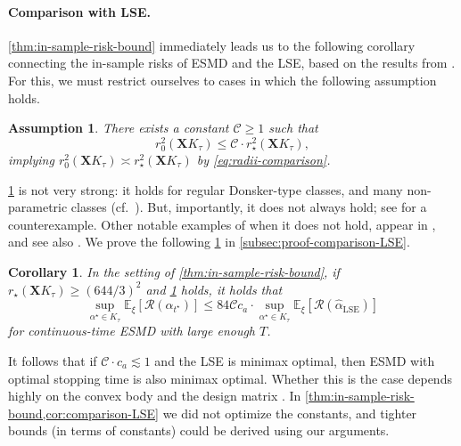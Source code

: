 \documentclass[a4paper]{article}
\newcommand{\br}[1]{\left[#1\right]}
\newcommand{\X}[0]{\mathbf{X}}
\newcommand{\EE}[0]{\mathbb{E}}
\newcommand{\cC}[0]{\mathcal{C}}
\newcommand{\cR}[0]{\mathcal{R}}
\newcommand{\ha}[0]{\widehat{\alpha}}
\newcommand{\alphastar}{\alpha^\star}
\newcommand{\alphatstar}[0]{\alpha_{t^\star}}
\DeclareMathOperator{\LSEOp}{LSE}
\newcommand{\haLSE}[0]{\ha_{{\LSEOp}}}
\newcommand{\Kt}[0]{K_\tau}
\newcommand{\rstar}[0]{r_\star}
\newcommand{\rzero}[0]{r_{0}}
\theoremstyle{thmstyle}
\newtheorem{corollary}{Corollary}
\theoremstyle{defstyle}
\newtheorem{assumption}{Assumption}
\theoremstyle{remark}
\begin{document}
\paragraph{Comparison with LSE.} \cref{thm:in-sample-risk-bound} immediately leads us to the following corollary connecting the in-sample risks of ESMD and the LSE, based on the results from \cite{Chatterjee2014}. For this, we must restrict ourselves to cases in which the following assumption holds. 
\begin{assumption}\label{ass:unreal}
    There exists a constant $\cC\geq 1$ such that 
    \begin{equation*}
        \rzero^2(\X\Kt)\leq \cC \cdot \rstar^2(\X\Kt),
    \end{equation*}
    implying $\rzero^2(\X\Kt)\asymp \rstar^2(\X\Kt)$ by \eqref{eq:radii-comparison}. 
\end{assumption}
\cref{ass:unreal} is not very strong: it holds for regular Donsker-type classes, and many non-parametric classes (cf.\ \citep{vandegeer2000empirical}). But, importantly, it does not always hold; see \citet[Sec. 3.1.3]{Prasadan2024some} for a counterexample. Other notable examples of when it does not hold, appear in \cite{kur2023variance}, and see also  \cite{aolaritei2025revisiting}.
We prove the following \cref{cor:comparison-LSE} in \cref{subsec:proof-comparison-LSE}. 
\begin{corollary}
\label{cor:comparison-LSE}
    In the setting of \cref{thm:in-sample-risk-bound}, if $\rstar(\X\Kt)\geq (644/3)^2$ and \cref{ass:unreal} holds, it holds that
    \begin{equation}
    \label{eq:sup-risk-comparison}
        \sup_{\alphastar\in \Kt} \EE_\xi\br{\cR(\alphatstar)}  \leq 84 \cC c_a \cdot \sup_{\alphastar\in \Kt} \EE_\xi\br{\cR(\haLSE)}
    \end{equation}
    for continuous-time ESMD with large enough $T$.
\end{corollary}
\noindent It follows that if $\cC \cdot c_a\lesssim 1$ and the LSE is minimax optimal, then ESMD with optimal stopping time is also minimax optimal. Whether this is the case depends highly on the convex body and the design matrix \citep{Raskutti2011,Kur2020suboptimality}. In \cref{thm:in-sample-risk-bound,cor:comparison-LSE} we did not optimize the constants, and tighter bounds (in terms of constants) could be derived using our arguments.
\end{document}

